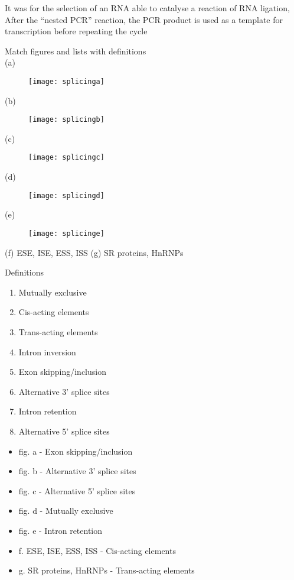 \begin{Answer} [
  ref={ex43},
  number={1}
 ]

\Question It was for the selection of an RNA able to catalyse a reaction of RNA
ligation, After the ``nested PCR'' reaction, the PCR product is used as a
template for transcription before repeating the cycle

\end{Answer}

\begin{Exercise} [
  label={ex44},
  origin={G. Valle}
 ]

\Question Match figures and lists with definitions\\
(a)
\begin{figure}[H]
\texttt{[image: splicinga]}
\end{figure}
(b)
\begin{figure}[H]
\texttt{[image: splicingb]}
\end{figure}
(c)
\begin{figure}[H]
\texttt{[image: splicingc]}
\end{figure}
(d)
\begin{figure}[H]
\texttt{[image: splicingd]}
\end{figure}
(e)
\begin{figure}[H]
\texttt{[image: splicinge]}
\end{figure}
(f) ESE, ISE, ESS, ISS
(g) SR proteins, HnRNPs

Definitions
\begin{enumerate}
\item Mutually exclusive
\item Cis-acting elements
\item Trans-acting elements
\item Intron inversion
\item Exon skipping/inclusion
\item Alternative 3' splice sites
\item Intron retention
\item Alternative 5' splice sites
\end{enumerate}

\end{Exercise}

\begin{Answer} [
  ref={ex44},
  number={1}
 ]

\Question 
\begin{itemize}
\item fig. a - Exon skipping/inclusion
\item fig. b - Alternative 3' splice sites
\item fig. c - Alternative 5' splice sites
\item fig. d - Mutually exclusive
\item fig. e - Intron retention
\item f. ESE, ISE, ESS, ISS - Cis-acting elements
\item g. SR proteins, HnRNPs - Trans-acting elements
\end{itemize}
\end{Answer}